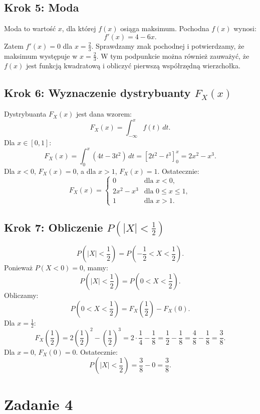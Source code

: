 \documentclass[polish, 8pt]{article}
\begin{document}
\subsection*{Krok 5: Moda}
Moda to wartość \(x\), dla której \(f(x)\) osiąga maksimum. Pochodna \(f(x)\) wynosi:
\[
f'(x) = 4 - 6x.
\]
Zatem \(f'(x) = 0\) dla \(x = \frac{2}{3}\). Sprawdzamy znak pochodnej i potwierdzamy, że maksimum występuje w \(x = \frac{2}{3}\). W tym podpunkcie można również zauważyć, że $f(x)$ jest funkcją kwadratową i obliczyć pierwszą współrzędną wierzchołka.

\subsection*{Krok 6: Wyznaczenie dystrybuanty \(F_X(x)\)}
Dystrybuanta \(F_X(x)\) jest dana wzorem:
\[
F_X(x) = \int_{-\infty}^x f(t) \, dt.
\]
Dla \(x \in [0, 1]\):
\[
F_X(x) = \int_0^x (4t - 3t^2) \, dt = \left[2t^2 - t^3\right]_0^x = 2x^2 - x^3.
\]
Dla \(x < 0\), \(F_X(x) = 0\), a dla \(x > 1\), \(F_X(x) = 1\). Ostatecznie:
\[
F_X(x) =
\begin{cases}
0 & \text{dla } x < 0, \\
2x^2 - x^3 & \text{dla } 0 \leq x \leq 1, \\
1 & \text{dla } x > 1.
\end{cases}
\]

\subsection*{Krok 7: Obliczenie \(P(|X| < \frac{1}{2})\)}
\[
P(|X| < \frac{1}{2}) = P\left(-\frac{1}{2} < X < \frac{1}{2}\right).
\]
Ponieważ \(P(X < 0) = 0\), mamy:
\[
P(|X| < \frac{1}{2}) = P\left(0 < X < \frac{1}{2}\right).
\]
Obliczamy:
\[
P\left(0 < X < \frac{1}{2}\right) = F_X\left(\frac{1}{2}\right) - F_X(0).
\]
Dla \(x = \frac{1}{2}\):
\[
F_X\left(\frac{1}{2}\right) = 2\left(\frac{1}{2}\right)^2 - \left(\frac{1}{2}\right)^3 = 2 \cdot \frac{1}{4} - \frac{1}{8} = \frac{1}{2} - \frac{1}{8} = \frac{4}{8} - \frac{1}{8} = \frac{3}{8}.
\]
Dla \(x = 0\), \(F_X(0) = 0\). Ostatecznie:
\[
P(|X| < \frac{1}{2}) = \frac{3}{8} - 0 = \frac{3}{8}.
\]

\section*{Zadanie 4}
\end{document}
